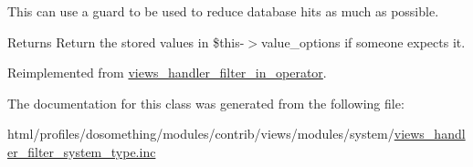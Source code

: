 This can use a guard to be used to reduce database hits as much as possible.

\begin{DoxyReturn}{Returns}
Return the stored values in \$this-\/$>$value\_\-options if someone expects it. 
\end{DoxyReturn}


Reimplemented from \hyperlink{classviews__handler__filter__in__operator_aa5b5df6d90f4359ed28c0c446bdc81a6}{views\_\-handler\_\-filter\_\-in\_\-operator}.

The documentation for this class was generated from the following file:\begin{DoxyCompactItemize}
\item 
html/profiles/dosomething/modules/contrib/views/modules/system/\hyperlink{views__handler__filter__system__type_8inc}{views\_\-handler\_\-filter\_\-system\_\-type.inc}\end{DoxyCompactItemize}
